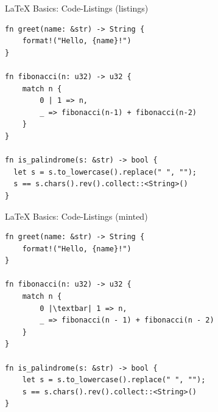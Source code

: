 \documentclass[main.tex]{subfiles}
\begin{document}
\begin{frame}[fragile]{\LaTeX{} Basics: Code-Listings (listings)}
    \begin{lstlisting}
fn greet(name: &str) -> String {
    format!("Hello, {name}!")
}

fn fibonacci(n: u32) -> u32 {
    match n {
        0 | 1 => n,
        _ => fibonacci(n-1) + fibonacci(n-2)
    }
}

fn is_palindrome(s: &str) -> bool {
  let s = s.to_lowercase().replace(" ", "");
  s == s.chars().rev().collect::<String>()
}
    \end{lstlisting}
\end{frame}

\begin{frame}[fragile]{\LaTeX{} Basics: Code-Listings (minted)}
    \begin{verbatim}
fn greet(name: &str) -> String {
    format!("Hello, {name}!")
}

fn fibonacci(n: u32) -> u32 {
    match n {
        0 |\textbar| 1 => n,
        _ => fibonacci(n - 1) + fibonacci(n - 2)
    }
}

fn is_palindrome(s: &str) -> bool {
    let s = s.to_lowercase().replace(" ", "");
    s == s.chars().rev().collect::<String>()
}
    \end{verbatim}
\end{frame}
\end{document}
